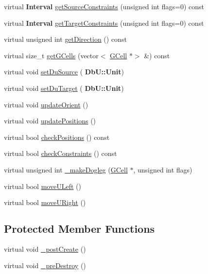 \begin{DoxyCompactItemize}
virtual \textbf{ Interval} \mbox{\hyperlink{classKatabatic_1_1AutoHorizontal_a3239751f475bc65adb9d56f6c771ebb0}{get\+Source\+Constraints}} (unsigned int flags=0) const
\item 
virtual \textbf{ Interval} \mbox{\hyperlink{classKatabatic_1_1AutoHorizontal_ad2b5aeb2604548378c8d78c60862091f}{get\+Target\+Constraints}} (unsigned int flags=0) const
\item 
virtual unsigned int \mbox{\hyperlink{classKatabatic_1_1AutoHorizontal_a0dd7cf705ace42c662c289955313b2e9}{get\+Direction}} () const
\item 
virtual size\+\_\+t \mbox{\hyperlink{classKatabatic_1_1AutoHorizontal_accdaef4410043f64da247a94a309733e}{get\+G\+Cells}} (vector$<$ \mbox{\hyperlink{classKatabatic_1_1GCell}{G\+Cell}} $\ast$$>$ \&) const
\item 
virtual void \mbox{\hyperlink{classKatabatic_1_1AutoHorizontal_a756616a1967c5ad8efd08be96d18f25d}{set\+Du\+Source}} (\textbf{ Db\+U\+::\+Unit})
\item 
virtual void \mbox{\hyperlink{classKatabatic_1_1AutoHorizontal_a9df2ef68c1fbf4159cc837be5c699b53}{set\+Du\+Target}} (\textbf{ Db\+U\+::\+Unit})
\item 
virtual void \mbox{\hyperlink{classKatabatic_1_1AutoHorizontal_a59058f4593049c583c5b3698ff81b299}{update\+Orient}} ()
\item 
virtual void \mbox{\hyperlink{classKatabatic_1_1AutoHorizontal_a9662a77c2ed8553d6a0312c5292060ad}{update\+Positions}} ()
\item 
virtual bool \mbox{\hyperlink{classKatabatic_1_1AutoHorizontal_a6575c17bfa589c087215c87678e5719c}{check\+Positions}} () const
\item 
virtual bool \mbox{\hyperlink{classKatabatic_1_1AutoHorizontal_a8aef8f4bbafe3426840f9ebf31bb3b81}{check\+Constraints}} () const
\item 
virtual unsigned int \mbox{\hyperlink{classKatabatic_1_1AutoHorizontal_a36c0eecad40d3559b5378caefec6a7e0}{\+\_\+make\+Dogleg}} (\mbox{\hyperlink{classKatabatic_1_1GCell}{G\+Cell}} $\ast$, unsigned int flags)
\item 
virtual bool \mbox{\hyperlink{classKatabatic_1_1AutoHorizontal_a1fa2421b74bf0eb934b7002fd3da2321}{move\+U\+Left}} ()
\item 
virtual bool \mbox{\hyperlink{classKatabatic_1_1AutoHorizontal_aa469e37853e31f8b1bc817518c896d62}{move\+U\+Right}} ()
\end{DoxyCompactItemize}
\subsection*{Protected Member Functions}
\begin{DoxyCompactItemize}
\item 
virtual void \mbox{\hyperlink{classKatabatic_1_1AutoHorizontal_a3715b38135ca24745f610bebd3407c10}{\+\_\+post\+Create}} ()
\item 
virtual void \mbox{\hyperlink{classKatabatic_1_1AutoHorizontal_a7c13d9795eafd477994961f8a0d962d0}{\+\_\+pre\+Destroy}} ()
\end{DoxyCompactItemize}
